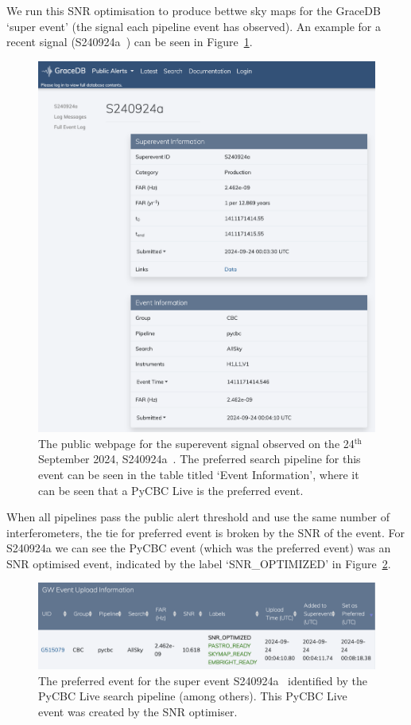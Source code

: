 We run this SNR optimisation to produce bettwe sky maps for the GraceDB `super event' (the \gwadj signal each pipeline event has observed). An example for a recent \gwadj signal (S240924a~\cite{superevent_S240924a}) can be seen in Figure~\ref{7:fig:gracedb_pref_event}.
%
\begin{figure}
    \centering
    \includegraphics[width=1.0\linewidth]{images/7_snr_optimiser/gracedb_public_snr_optimiser.png}
    \caption{The public webpage for the superevent \gwadj signal observed on the 24$^{\text{th}}$ September 2024, S240924a~\cite{superevent_S240924a}. The preferred search pipeline for this event can be seen in the table titled `Event Information', where it can be seen that a PyCBC Live is the preferred event.}
    \label{7:fig:gracedb_pref_event}
\end{figure}
%
When all pipelines pass the public alert threshold and use the same number of interferometers, the tie for preferred event is broken by the SNR of the event. For S240924a we can see the PyCBC event (which was the preferred event) was an SNR optimised event, indicated by the label `SNR\_OPTIMIZED' in Figure~\ref{7:fig:gracedb_snr_optimizer}.
%
\begin{figure}
    \centering
    \includegraphics[width=1.0\linewidth]{images/7_snr_optimiser/gracedb_pycbc_pref_event.png}
    \caption{The preferred event for the super event S240924a~\cite{superevent_S240924a} identified by the PyCBC Live search pipeline (among others). This PyCBC Live event was created by the SNR optimiser.}
    \label{7:fig:gracedb_snr_optimizer}
\end{figure}
%

